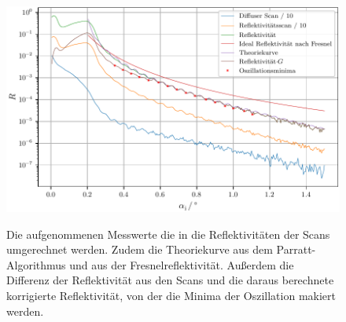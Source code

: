 \\\\
\begin{figure}
    \centering
    \caption{Die aufgenommenen Messwerte die in die Reflektivitäten der Scans umgerechnet werden. Zudem die Theoriekurve aus dem Parratt-Algorithmus und aus der Fresnelreflektivität.
    Außerdem die Differenz der Reflektivität aus den Scans und die daraus berechnete korrigierte Reflektivität, von der die Minima der Oszillation makiert werden.}
    \includegraphics[width=\textwidth]{content/data/reflek.pdf}
    \label{fig:reflek}
\end{figure}
\FloatBarrier
